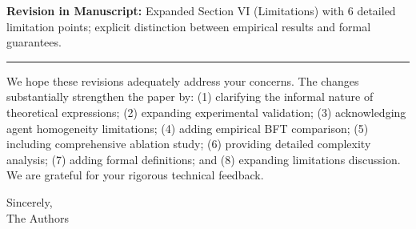 \documentclass[11pt,a4paper]{article}
\newcommand{\revision}[1]{%
  \noindent\textbf{Revision in Manuscript:} #1\vspace{4pt}}
\begin{document}
\revision{Expanded Section VI (Limitations) with 6 detailed limitation points; explicit distinction between empirical results and formal guarantees.}

\vspace{12pt}
\noindent\rule{\textwidth}{0.4pt}
\vspace{6pt}

\noindent We hope these revisions adequately address your concerns. The changes substantially strengthen the paper by: (1) clarifying the informal nature of theoretical expressions; (2) expanding experimental validation; (3) acknowledging agent homogeneity limitations; (4) adding empirical BFT comparison; (5) including comprehensive ablation study; (6) providing detailed complexity analysis; (7) adding formal definitions; and (8) expanding limitations discussion. We are grateful for your rigorous technical feedback.

\vspace{12pt}
\noindent Sincerely,\\
The Authors
\end{document}
